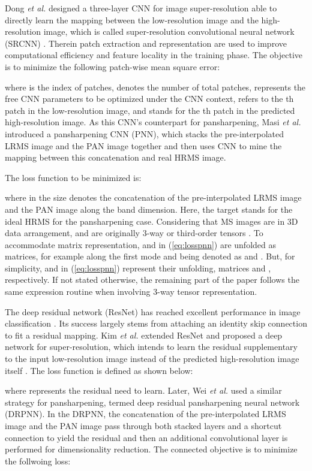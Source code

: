 \documentclass[journal]{IEEEtran}
\begin{document}
Dong \emph{et al.} designed a three-layer CNN for image super-resolution able to directly learn the mapping between the low-resolution image and the high-resolution image, which is called super-resolution convolutional neural network (SRCNN) \cite{SuperRes-CNN:Dong2016}. Therein patch extraction and representation are used to improve computational efficiency and feature locality in the training phase. The objective is to minimize the following patch-wise mean square error:

where  is the index of patches,  denotes the number of total patches,  represents the free CNN parameters to be optimized under the CNN context,  refers to the th patch in the low-resolution image, and  stands for the th patch in the predicted high-resolution image. As this CNN's counterpart for pansharpening, Masi  \emph{et al.} introduced a pansharpening CNN (PNN)\cite{CNN-Pansharp:Masi2016}, which stacks the pre-interpolated LRMS image and the PAN image together and then uses CNN to mine the mapping between this concatenation and real HRMS image.

The loss function to be minimized is:

where  in the size  denotes the concatenation of the pre-interpolated LRMS image  and the PAN image  along the band dimension. Here, the target  stands for the ideal HRMS for the pansharpening case. Considering that MS images are in 3D data arrangement,  and  are originally 3-way or third-order tensors \cite{kolda2009tensor}. To accommodate matrix representation,  and  in (\ref{eq:losspnn}) are unfolded as matrices, for example along the first mode and being denoted as  and  \cite{kolda2009tensor}. But, for simplicity,  and  in (\ref{eq:losspnn}) represent their unfolding, matrices  and , respectively. If not stated otherwise, the remaining part of the paper follows the same expression routine when involving 3-way tensor representation.

The deep residual network (ResNet) has reached excellent performance in image classification \cite{Resnet:He2015}. Its success largely stems from attaching an identity skip connection to fit a residual mapping. Kim \emph{et al.} extended ResNet and proposed a deep network for super-resolution, which intends to learn the residual supplementary to the input low-resolution image instead of the predicted high-resolution image itself \cite{SuperRes-CNN:Kim2016}. The loss function is defined as shown below:

where  represents the residual need to learn. Later, Wei \emph{et al.} used a similar strategy for pansharpening, termed deep residual pansharpening neural network (DRPNN)\cite{Wei2017Boosting}. In the DRPNN, the concatenation of the pre-interpolated LRMS image and the PAN image pass through both stacked layers and a shortcut connection to yield the residual and then an additional convolutional layer is performed for dimensionality reduction. The connected objective is to minimize the follwoing loss:
\end{document}
